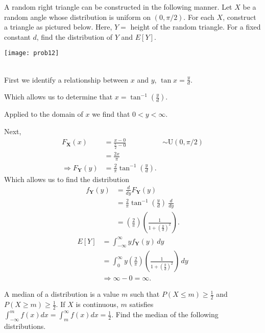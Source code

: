 \documentclass[12pt,letterpaper]{exam}
\begin{document}
\begin{questions}
	\setcounter{question}{11}
	\question A random right triangle can be constructed in the following manner. Let $X$ be a random angle whose distribution is uniform on $(0, \pi / 2)$. For each $X$, construct a triangle as pictured below. Here, $Y =$ height of the random triangle. For a fixed constant $d$, find the distribution of $Y$ and $E[Y]$. 
	\begin{center}
	\texttt{[image: prob12]}
	\end{center}
	
	\begin{solution} \\
		First we identify a relationship between $x$ and $y$, $\tan x = \frac{y}{d}$.
		
		Which allows us to determine that $x = \tan^{-1}\left(\frac{y}{d}\right)$.
		
		Applied to the domain of $x$  we find that $0<y<\infty$.
		
		Next,
		\begin{align*}
			F_\mathbf{X}(x) 
			&= \frac{x-0}{\frac{\pi}{2}-0} &\sim\text{U}(0, \pi / 2) \\
			&= \frac{2x}{\pi} \\
			\Rightarrow F_\mathbf{Y}(y)
			&= \frac{2}{\pi}\tan^{-1}\left(\frac{y}{d}\right).
		\end{align*}
		Which allows us to find the distribution
		\begin{align*}
			f_\mathbf{Y}(y)
			&= \frac{d}{dy} F_\mathbf{Y}(y) \\
			&= \frac{2}{\pi}\tan^{-1}\left(\frac{y}{d}\right) \ \frac{d}{dy} \\
			&= \left(\frac{2}{\pi}\right)\left(\frac{1}{1+(\frac{y}{d})^2}\right).
		\end{align*}
		\begin{align*}
			E[Y] 
			&= \int_{-\infty}^{\infty} y f_\mathbf{Y}(y) \,dy \\
			&= \int_{0}^{\infty} y \left(\frac{2}{\pi}\right)\left(\frac{1}{1+(\frac{y}{d})^2}\right) \,dy \\
			&\Rightarrow \infty - 0 = \infty.
		\end{align*}
		
	\end{solution}
	
	\setcounter{question}{16}
	\question  A median of a distribution is a value $m$ such that $P(X \le m) \ge \frac{1}{2}$ and $P(X \ge m) \ge \frac{1}{2}$.
	If $X$ is continuous, $m$ satisfies $\int_{-\infty}^{m} f(x) dx = \int_{m}^{\infty} f(x) dx = \frac{1}{2}$. Find the median of the following distributions.
	\begin{parts}

\end{parts}
\end{questions}
\end{document}
